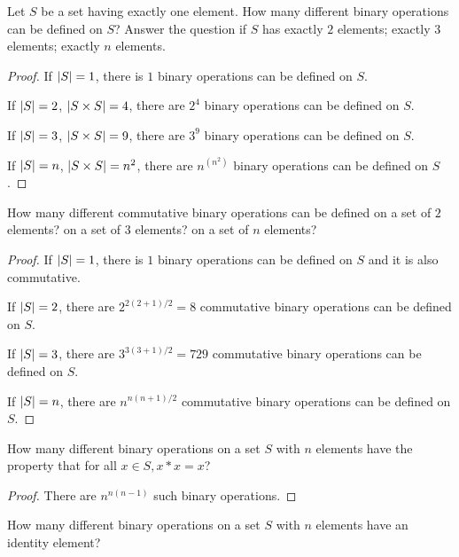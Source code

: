 \newpage
\begin{exercise}
    Let $S$ be a set having exactly one element. How many different binary operations can be defined on $S$? Answer the question if $S$ has exactly $2$ elements; exactly $3$ elements; exactly $n$ elements.
\end{exercise}

\begin{proof}
    If $\left\vert{S}\right\vert = 1$, there is $1$ binary operations can be defined on $S$.

    If $\left\vert{S}\right\vert = 2$, $\left\vert{S\times S}\right\vert = 4$, there are $2^{4}$ binary operations can be defined on $S$.

    If $\left\vert{S}\right\vert = 3$, $\left\vert{S\times S}\right\vert = 9$, there are $3^{9}$ binary operations can be defined on $S$.

    If $\left\vert{S}\right\vert = n$, $\left\vert{S\times S}\right\vert = n^{2}$, there are $n^{(n^{2})}$ binary operations can be defined on $S$.
\end{proof}

\newpage
\begin{exercise}
    How many different commutative binary operations can be defined on a set of $2$ elements? on a set of $3$ elements? on a set of $n$ elements?
\end{exercise}

\begin{proof}
    If $\left\vert{S}\right\vert = 1$, there is $1$ binary operations can be defined on $S$ and it is also commutative.

    If $\left\vert{S}\right\vert = 2$, there are $2^{2(2+1)/2} = 8$ commutative binary operations can be defined on $S$.

    If $\left\vert{S}\right\vert = 3$, there are $3^{3(3+1)/2} = 729$ commutative binary operations can be defined on $S$.

    If $\left\vert{S}\right\vert = n$, there are $n^{n(n+1)/2}$ commutative binary operations can be defined on $S$.
\end{proof}

\newpage
\begin{exercise}
    How many different binary operations on a set $S$ with $n$ elements have the property that for all $x\in S, x * x = x$?
\end{exercise}

\begin{proof}
    There are $n^{n(n-1)}$ such binary operations.
\end{proof}

\newpage
\begin{exercise}
    How many different binary operations on a set $S$ with $n$ elements have an identity element?
\end{exercise}

